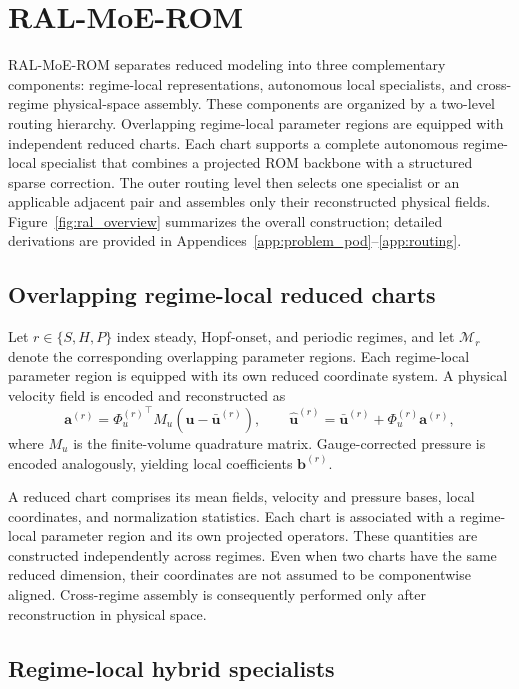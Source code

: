 \section{RAL-MoE-ROM}
\label{sec:method}

RAL-MoE-ROM separates reduced modeling into three complementary components: regime-local representations, autonomous local specialists, and
cross-regime physical-space assembly. These components are organized by a two-level routing hierarchy. Overlapping regime-local parameter regions are equipped with independent reduced charts. Each chart supports a complete autonomous regime-local specialist that combines a projected ROM backbone with a structured sparse correction. The outer routing level then selects one specialist or an applicable adjacent pair and assembles only their reconstructed physical fields. Figure~\ref{fig:ral_overview} summarizes the overall construction; detailed
derivations are provided in Appendices~\ref{app:problem_pod}--\ref{app:routing}.

\subsection{Overlapping regime-local reduced charts}

Let $r\in\{S,H,P\}$ index steady, Hopf-onset, and periodic regimes, and let $\mathcal M_r$ denote the corresponding overlapping parameter regions. Each regime-local parameter region is equipped with its own reduced coordinate system. A physical velocity field is encoded and reconstructed as
\begin{equation}
  \bm a^{(r)}={\Phi_u^{(r)}}^{\top}M_u(\bm u-\bar{\bm u}^{(r)}),\qquad
  \widehat{\bm u}^{(r)}=\bar{\bm u}^{(r)}+\Phi_u^{(r)}\bm a^{(r)},
  \label{eq:main_chart}
\end{equation}
where $M_u$ is the finite-volume quadrature matrix. Gauge-corrected pressure is encoded analogously, yielding local coefficients
$\bm b^{(r)}$. 

A reduced chart comprises its mean fields, velocity and pressure bases, local coordinates, and normalization statistics. Each chart is associated with a regime-local parameter region and its own projected operators.
These quantities are constructed independently across regimes. Even when two charts have the same reduced dimension, their coordinates are not assumed to be componentwise aligned. Cross-regime assembly is consequently performed only after reconstruction in physical space.

\subsection{Regime-local hybrid specialists}

